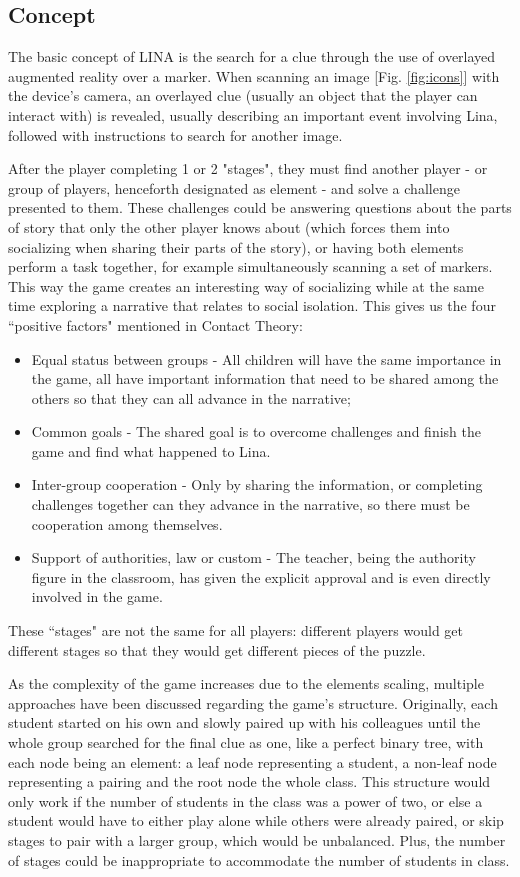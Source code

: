 \subsection{Concept} The basic concept of LINA is the search for a clue through the use of overlayed augmented reality over a marker. When scanning an image [Fig. \ref{fig:icons}] with the device's camera, an overlayed clue (usually an object that the player can interact with) is revealed, usually describing an important event involving Lina, followed with instructions to search for another image.
\par After the player completing 1 or 2 "stages", they must find another player - or group of players, henceforth designated as element - and solve a challenge presented to them. These challenges could be answering questions about the parts of story that only the other player knows about (which forces them into socializing when sharing their parts of the story), or having both elements perform a task together, for example simultaneously scanning a set of markers. This way the game creates an interesting way of socializing while at the same time exploring a narrative that relates to social isolation. This gives us the four ``positive factors" mentioned in Contact Theory:
\begin{itemize}
	\item Equal status between groups - All children will have the same importance in the game, all have important information that need to be shared among the others so that they can all advance in the narrative;
	\item Common goals - The shared goal is to overcome challenges and finish the game and find what happened to Lina.
	\item Inter-group cooperation - Only by sharing the information, or completing challenges together can they advance in the narrative, so there must be cooperation among themselves.
	\item Support of authorities, law or custom - The teacher, being the authority figure in the classroom, has given the explicit approval and is even directly involved in the game.
\end{itemize}
These ``stages" are not the same for all players: different players would get different stages so that they would get different pieces of the puzzle.
\par As the complexity of the game increases due to the elements scaling, multiple approaches have been discussed regarding the game's structure. Originally, each student started on his own and slowly paired up with his colleagues until the whole group searched for the final clue as one, like a perfect binary tree, with each node being an element: a leaf node representing a student, a non-leaf node representing a pairing and the root node the whole class. This structure would only work if the number of students in the class was a power of two, or else a student would have to either play alone while others were already paired, or skip stages to pair with a larger group, which would be unbalanced. Plus, the number of stages could be inappropriate to accommodate the number of students in class. 
